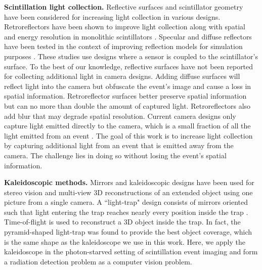 \textbf{Scintillation light collection.} Reflective surfaces and scintillator geometry have been considered for increasing 
light collection in various designs.
Retroreflectors have been shown to improve light collection along with spatial 
and energy resolution in monolithic scintillators \cite{mcelroy2002use,heemskerk2009micro,ros2014retroreflector,gonzalez2017performance}.
Specular and diffuse reflectors have been tested in the context of improving 
reflection models for simulation purposes \cite{janecek2010simulating,roncali2017integrated,trigila2021optimization}.
These studies use designs where a sensor is coupled to the scintillator's surface.
To the best of our knowledge, reflective surfaces have not been reported for 
collecting additional light in camera designs.
Adding diffuse surfaces will reflect light into the camera but obfuscate the 
event's image and cause a loss in spatial information.
Retroreflector surfaces better preserve spatial information but can no more than 
double the amount of captured light.
Retroreflectors also add blur that may degrade spatial resolution.
Current camera designs only capture light emitted directly to the camera,
which is a small fraction of all the light emitted from an event 
\cite{bocchieri2024scintillation, yamamoto2023development, d2021novel, gao2023novel, losko2021new,adams2017gamma,balasubramanian2022x,gustschin2024event}.
The goal of this work is to increase light collection by capturing additional 
light from an event that is emitted away from the camera.
The challenge lies in doing so without losing the event's spatial information.

\noindent
\textbf{Kaleidoscopic methods.} Mirrors and kaleidoscopic designs have been used for stereo vision \cite{nene1998stereo, gluckman1999planar, gluckman2002rectified} 
and multi-view 3D reconstructions \cite{reshetouski2011three, ahn2021kaleidoscopic, ahn2023neural, takahashi2021structure, bangay2004kaleidoscope, mitsumoto19923}
of an extended object using one picture from a single camera.
A ``light-trap" design consists of mirrors oriented such that light entering the 
trap reaches nearly every position inside the trap \cite{xu2018trapping}.
Time-of-flight is used to reconstruct a 3D object inside the trap.
In fact, the pyramid-shaped light-trap was found to provide the best object 
coverage, which is the same shape as the kaleidoscope we use in this work.
Here, we apply the kaleidoscope in the photon-starved setting of scintillation 
event imaging and form a radiation detection problem as a computer vision problem.

